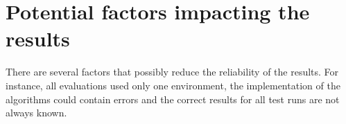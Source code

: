 \section{Potential factors impacting the results}
\label{sec:truth_results}

There are several factors that possibly reduce the reliability of the results. For instance, all evaluations used only one environment, the implementation of the algorithms could contain errors and the correct results for all test runs are not always known. 






